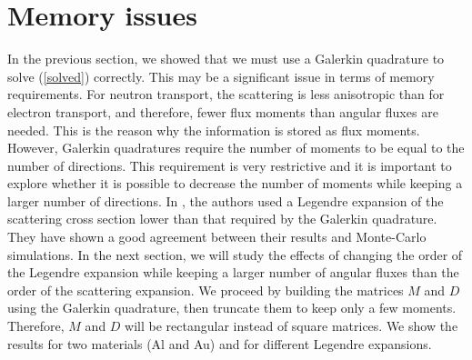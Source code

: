 \section{Memory issues}
In the previous section, we showed that we must use a Galerkin quadrature to solve
(\ref{solved}) correctly. This may be a significant issue in terms of memory
requirements.  
For neutron transport, the scattering is less anisotropic than for electron
transport, and therefore, fewer flux moments than angular 
fluxes are needed. This is the reason why the information is stored as flux moments. 
However, Galerkin quadratures require the number of moments 
to be equal to the number of directions. This requirement is very restrictive and it 
is important to explore whether it is possible to decrease the number of moments 
while keeping a larger number of directions. In \cite{mem}, the authors used a 
Legendre expansion of the scattering cross section lower than that required by the 
Galerkin quadrature. They have shown a good agreement between their results 
and Monte-Carlo simulations. In the next section, we will study the effects of changing 
the order of the Legendre expansion while keeping a larger number of angular 
fluxes than the order of the scattering expansion. We proceed  by building 
the matrices $M$ and $D$ using the Galerkin quadrature, then truncate them 
to keep only a few moments. Therefore, $M$ and $D$ will be rectangular instead 
of square matrices. We show the results for two materials (Al and Au) 
and for different Legendre expansions.
